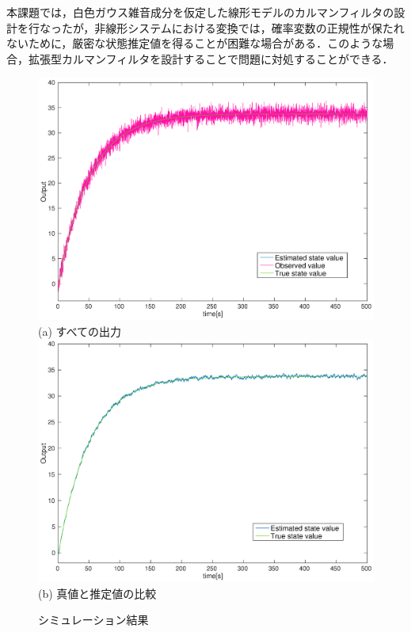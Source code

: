 \documentclass[a4paper,12pt]{jarticle}
\begin{document}
本課題では，白色ガウス雑音成分を仮定した線形モデルのカルマンフィルタの設計を行なったが，非線形システムにおける変換では，確率変数の正規性が保たれないために，厳密な状態推定値を得ることが困難な場合がある\cite{2}．このような場合，拡張型カルマンフィルタを設計することで問題に対処することができる．

\begin{figure}[H]
 \centering
 \vspace{0.5cm}
 \includegraphics[scale=0.52]{../figure/eps/alloutput.eps}\\
 \hspace{0.0cm}
 (a) すべての出力\\
 \vspace{1.2cm}
 \includegraphics[scale=0.52]{../figure/eps/estimated.eps}\\
 (b) 真値と推定値の比較\\
 \caption{シミュレーション結果}
 \label{result}
\end{figure}
\end{document}
